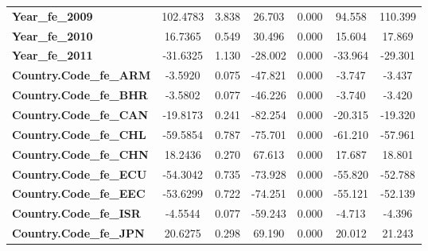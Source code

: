 \begin{center}
\begin{tabular}{lcccccc}
\textbf{Year\_fe\_2009}                                            &     102.4783  &        3.838     &    26.703  &         0.000        &       94.558    &      110.399     \\
\textbf{Year\_fe\_2010}                                            &      16.7365  &        0.549     &    30.496  &         0.000        &       15.604    &       17.869     \\
\textbf{Year\_fe\_2011}                                            &     -31.6325  &        1.130     &   -28.002  &         0.000        &      -33.964    &      -29.301     \\
\textbf{Country.Code\_fe\_ARM}                                     &      -3.5920  &        0.075     &   -47.821  &         0.000        &       -3.747    &       -3.437     \\
\textbf{Country.Code\_fe\_BHR}                                     &      -3.5802  &        0.077     &   -46.226  &         0.000        &       -3.740    &       -3.420     \\
\textbf{Country.Code\_fe\_CAN}                                     &     -19.8173  &        0.241     &   -82.254  &         0.000        &      -20.315    &      -19.320     \\
\textbf{Country.Code\_fe\_CHL}                                     &     -59.5854  &        0.787     &   -75.701  &         0.000        &      -61.210    &      -57.961     \\
\textbf{Country.Code\_fe\_CHN}                                     &      18.2436  &        0.270     &    67.613  &         0.000        &       17.687    &       18.801     \\
\textbf{Country.Code\_fe\_ECU}                                     &     -54.3042  &        0.735     &   -73.928  &         0.000        &      -55.820    &      -52.788     \\
\textbf{Country.Code\_fe\_EEC}                                     &     -53.6299  &        0.722     &   -74.251  &         0.000        &      -55.121    &      -52.139     \\
\textbf{Country.Code\_fe\_ISR}                                     &      -4.5544  &        0.077     &   -59.243  &         0.000        &       -4.713    &       -4.396     \\
\textbf{Country.Code\_fe\_JPN}                                     &      20.6275  &        0.298     &    69.190  &         0.000        &       20.012    &       21.243     \\

\end{tabular}
\end{center}
